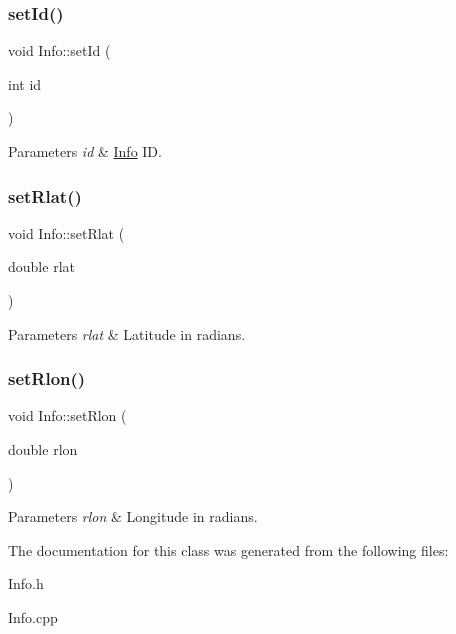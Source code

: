 \subsubsection{\texorpdfstring{set\+Id()}{setId()}}
{\footnotesize\ttfamily void Info\+::set\+Id (\begin{DoxyParamCaption}\item[{int}]{id }\end{DoxyParamCaption})}


\begin{DoxyParams}{Parameters}
{\em id} & \hyperlink{class_info}{Info} ID. \\
\hline
\end{DoxyParams}
\mbox{\label{class_info_a27d233723f43ea183047fbcb6bbc0d7f}} 
\subsubsection{\texorpdfstring{set\+Rlat()}{setRlat()}}
{\footnotesize\ttfamily void Info\+::set\+Rlat (\begin{DoxyParamCaption}\item[{double}]{rlat }\end{DoxyParamCaption})}


\begin{DoxyParams}{Parameters}
{\em rlat} & Latitude in radians. \\
\hline
\end{DoxyParams}
\mbox{\label{class_info_a41adc61220842b6729762502a006897a}} 
\subsubsection{\texorpdfstring{set\+Rlon()}{setRlon()}}
{\footnotesize\ttfamily void Info\+::set\+Rlon (\begin{DoxyParamCaption}\item[{double}]{rlon }\end{DoxyParamCaption})}


\begin{DoxyParams}{Parameters}
{\em rlon} & Longitude in radians. \\
\hline
\end{DoxyParams}


The documentation for this class was generated from the following files\+:\begin{DoxyCompactItemize}
\item 
Info.\+h\item 
Info.\+cpp\end{DoxyCompactItemize}
